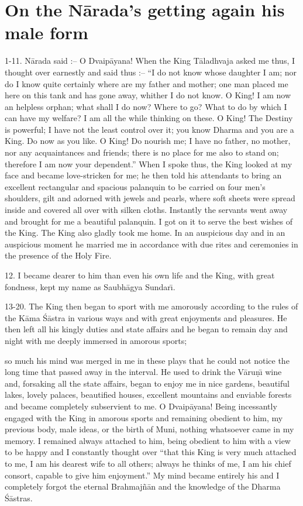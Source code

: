 \chapter{On the N\=arada's getting again his male form}

1-11. N\=arada said :-- O Dvaip\=ayana! When the King T\=aladhvaja asked me thus, I thought over earnestly and said thus :-- ``I do not know whose daughter I am; nor do I know quite certainly where are my father and mother; one man placed me here on this tank and has gone away, whither I do not know. O King! I am now an helpless orphan; what shall I do now? Where to go? What to do by which I can have my welfare? I am all the while thinking on these. O King! The Destiny is powerful; I have not the least control over it; you know Dharma and you are a King. Do now as you like. O King! Do nourish me; I have no father, no mother, nor any acquaintances and friends; there is no place for me also to stand on; therefore I am now your dependent.'' When I spoke thus, the King looked at my face and became love-stricken for me; he then told his attendants to bring an excellent rectangular and spacious palanquin to be carried on four men's shoulders, gilt and adorned with jewels and pearls, where soft sheets were spread inside and covered all over with silken cloths. Instantly the servants went away and brought for me a beautiful palanquin. I got on it to serve the best wishes of the King. The King also gladly took me home. In an auspicious day and in an auspicious moment he married me in accordance with due rites and ceremonies in the presence of the Holy Fire.

12. I became dearer to him than even his own life and the King, with great fondness, kept my name as Saubh\=agya Sundar\={\i}.

13-20. The King then began to sport with me amorously according to the rules of the K\=ama \'S\=astra in various ways and with great enjoyments and pleasures. He then left all his kingly duties and state affairs and he began to remain day and night with me deeply immersed in amorous sports;

so much his mind was merged in me in these plays that he could not notice the long time that passed away in the interval. He used to drink the V\=aru\d{n}\={\i} wine and, forsaking all the state affairs, began to enjoy me in nice gardens, beautiful lakes, lovely palaces, beautified houses, excellent mountains and enviable forests and became completely subservient to me. O Dvaip\=ayana! Being incessantly engaged with the King in amorous sports and remaining obedient to him, my previous body, male ideas, or the birth of Muni, nothing whatsoever came in my memory. I remained always attached to him, being obedient to him with a view to be happy and I constantly thought over ``that this King is very much attached to me, I am his dearest wife to all others; always he thinks of me, I am his chief consort, capable to give him enjoyment.'' My mind became entirely his and I completely forgot the eternal Brahmaj\~n\=an and the knowledge of the Dharma \'S\=astras.

